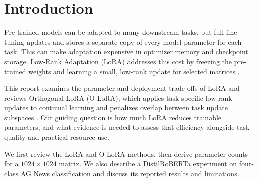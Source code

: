 \section{Introduction}
Pre-trained models can be adapted to many downstream tasks, but
full fine-tuning updates and stores a separate copy of every model
parameter for each task. This can make adaptation expensive in optimizer
memory and checkpoint storage. Low-Rank Adaptation (LoRA) addresses this
cost by freezing the pre-trained weights and learning a small, low-rank
update for selected matrices \cite{hu2022lora}.

This report examines the parameter and deployment trade-offs of LoRA and
reviews Orthogonal LoRA (O-LoRA), which applies task-specific low-rank
updates to continual learning and penalizes overlap between task update
subspaces \cite{wang2023olora}. Our guiding question is how much LoRA
reduces trainable parameters, and what evidence is needed to assess that
efficiency alongside task quality and practical resource use.

We first review the LoRA and O-LoRA methods, then derive parameter counts
for a $1024\times1024$ matrix. We also describe a DistilRoBERTa experiment
on four-class AG News classification and discuss its reported results and
limitations.
